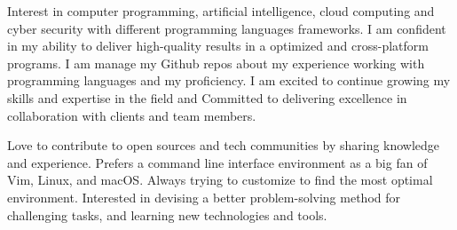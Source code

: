 

\begin{cvparagraph}

Interest in computer programming, artificial intelligence, cloud computing and cyber security with different programming languages \+ frameworks. I am confident in my ability to deliver high-quality results in a optimized and cross-platform programs. I am manage my Github repos about my experience working with programming languages and my proficiency. I am excited to continue growing my skills and expertise in the field and Committed to delivering excellence in collaboration with clients and team members.

Love to contribute to open sources and tech communities by sharing knowledge and experience. Prefers a command line interface environment as a big fan of Vim, Linux, and macOS. Always trying to customize to find the most optimal environment. Interested in devising a better problem-solving method for challenging tasks, and learning new technologies and tools.
\end{cvparagraph}
